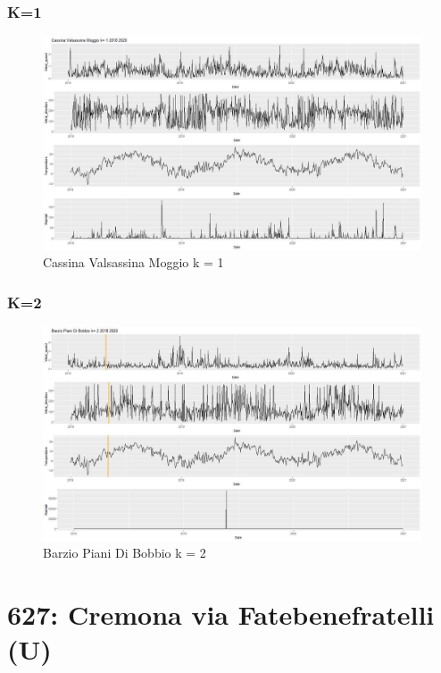 \documentclass{article}
\begin{document}
\subsubsection{K=1}
\begin{figure}[H]
  \centering 
  \includegraphics[scale = 0.3]{Picture/1/Cassina Valsassina Moggio k= 1 2018 2020 .jpeg}
  \caption{Cassina Valsassina Moggio k = 1 }
  \centering
\end{figure}
\subsubsection{K=2}
\begin{figure}[H]
  \centering 
  \includegraphics[scale = 0.3]{Picture/2/Barzio Piani Di Bobbio k= 2 2018 2020 .jpeg}
  \caption{Barzio Piani Di Bobbio k = 2}
  \centering
\end{figure}

\section{627: Cremona via Fatebenefratelli (U)}
\end{document}
